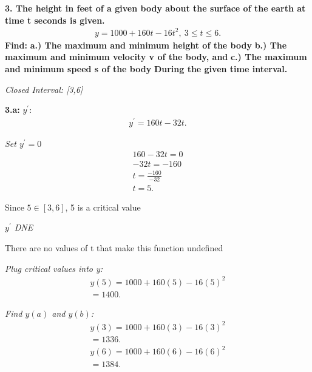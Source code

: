 \documentclass{report}
\begin{document}
    \bigbreak \noindent 
    \begin{mdframed}
      \textbf{3. The height in feet of a given body about the surface of the earth at time t seconds is given.}
      \begin{align*}
        y = 1000 + 160t -16t^{2},\ 3\leq t \leq 6
      .\end{align*}
      \bigbreak \noindent 
      \textbf{Find:}
      \bigbreak \noindent 
      \textbf{a.) The maximum and minimum height of the body}
      \bigbreak \noindent 
      \textbf{b.) The maximum and minimum velocity v of the body, and}
      \bigbreak \noindent 
      \textbf{c.) The maximum and minimum speed s of the body}
      \bigbreak \noindent 
      \textbf{During the given time interval.}

      \bigbreak \noindent 
      \textit{Closed Interval: [3,6]}

      \bigbreak \noindent 
      \hspace{\parindent} \textbf{3.a: }
      \bigbreak \noindent 
      \textit{$y^{\prime}$}:
      \begin{align*}
        y^{\prime} = 160t-32t
      .\end{align*}

      \bigbreak \noindent 
      \textit{Set $y^{\prime}=0$}
      \begin{align*}
        160-32t = 0 \\
        -32t = -160 \\
        t = \frac{-160}{-32} \\
        t = 5 
      .\end{align*}
      \begin{center}
        Since $5 \in [3,6]$, 5 is a critical value
      \end{center}

      \bigbreak \noindent 
      \textit{$y^{\prime}$ DNE}
      \begin{center}
        There are no values of t that make this function undefined
      \end{center}

      \bigbreak \noindent 
      \textit{Plug critical values into y:}
      \begin{align*}
        y(5) = 1000 + 160(5) -16(5)^{2} \\
        \boxed{=1400}
      .\end{align*}

      \bigbreak \noindent 
      \textit{Find $y(a)$ and $y(b)$:}
      \begin{align*}
        y(3) = 1000+160(3)-16(3)^{2} \\
        \boxed{=1336}
      .\end{align*}
      \begin{align*}
        y(6) = 1000+160(6)-16(6)^{2} \\
        \boxed{=1384}
      .\end{align*}


\end{mdframed}
\end{document}
